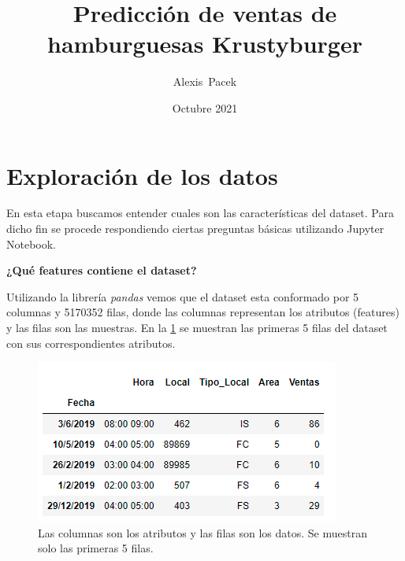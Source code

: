 \documentclass[11pt,spanish]{article}
\begin{document}
\renewcommand\Authfont{\fontsize{12}{14.4}\selectfont}
\renewcommand\Affilfont{\fontsize{9}{10.8}\itshape}
\renewcommand\Authand{,}
\renewcommand\Authands{,}

\title{Predicción de ventas de hamburguesas Krustyburger}

\author[1]{Alexis~Pacek}



\date{Octubre 2021}

\maketitle

\begin{abstract}


\end{abstract}

\section{Exploración de los datos}
En esta etapa buscamos entender cuales son las características del dataset.
Para dicho fin se procede respondiendo ciertas preguntas básicas utilizando Jupyter Notebook.

\vspace{3mm}

\textbf{¿Qué features contiene el dataset?}

\vspace{3mm}

Utilizando la librería \textit{pandas} vemos que el dataset esta conformado por 5 columnas y 5170352 filas, donde las columnas representan los atributos (features) y las filas son las muestras.
En la \cref{fig:head} se muestran las primeras 5 filas del dataset con sus correspondientes atributos.

\begin{figure}[H]
    \centering
    \includegraphics{Exploratorio/head.png}
    \caption{Las columnas son los atributos y las filas son los datos. Se muestran solo las primeras 5 filas.}
    \label{fig:head}
\end{figure}
\end{document}
